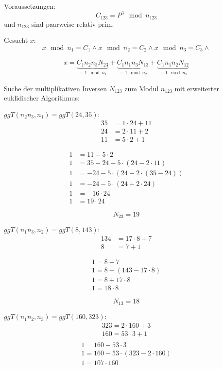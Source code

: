 Voraussetzungen: 
	$$ C_{123} = P^3 \mod n_{123} $$
und $n_{123}$ sind paarweise relativ prim.

Gesucht $x$:
$$ x \mod n_{1} = C_{1} \wedge
   x \mod n_{2} = C_{2} \wedge
   x \mod n_{3} = C_{3} \wedge   $$



\begin{align}
	x = \underbrace{C_{1} n_{2} n_{3} N_{23}}_{\equiv 1 \mod n_1}
	  + \underbrace{C_{1} n_{1} n_{3} N_{13}}_{\equiv 1 \mod n_2}
	  + \underbrace{C_{1} n_{1} n_{2} N_{12}}_{\equiv 1 \mod n_3}
\end{align}

Suche der multiplikativen Inversen $N_{123}$ zum Modul $n_{123}$ mit erweiterter euklidischer Algorithmus:

$ggT(n_{2}n_{3},n_{1}) = ggT(24,35):$
\begin{align}
35 &= 1 \cdot 24+11			\\
24 &= 2 \cdot 11+2			\\
11 &= 5 \cdot 2+1			
\end{align}

\begin{align}
1 &= 11 - 5 \cdot 2						\\
1 &= 35 -24 - 5 \cdot (24-2 \cdot 11)	\\
1 &= -24 -5 \cdot (24-2 \cdot (35-24))  \\
1 &= -24 -5 \cdot (24+2 \cdot 24)		\\
1 &= -16 \cdot 24						\\
1 &=  19 \cdot 24						
\end{align}

$$N_{23} = 19$$

$ggT(n_{1}n_{3}, n_{2}) = ggT(8,143):$
\begin{align}
134   &= 17 \cdot 8+7			\\
8     &= 7+1
\end{align}

\begin{align}
1 = 8 -7						\\
1 = 8 -(143-17 \cdot 8)			\\
1 = 8+17 \cdot 8				\\
1 = 18 \cdot 8					
\end{align}

$$N_{13} = 18$$

$ggT(n_{1}n_{2}, n_{3}) = ggT(160,323):$
\begin{align}
323 = 2 \cdot 160+3\\
160 = 53 \cdot 3+1\\
\end{align}
\begin{align}
1 = 160-53 \cdot 3 \\
1 = 160-53 \cdot (323-2 \cdot 160) \\
1 = 107 \cdot 160
\end{align}

